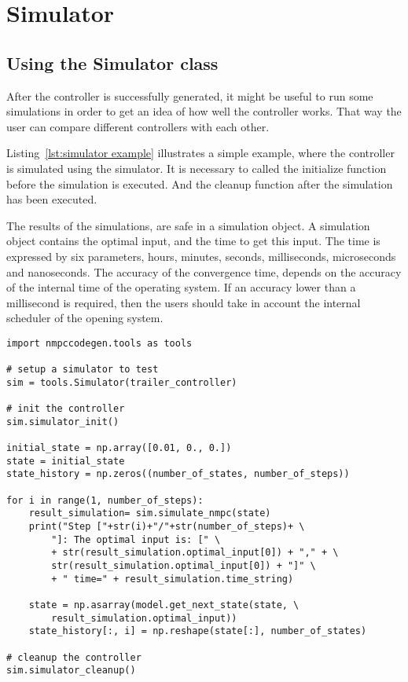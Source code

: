 \section{Simulator}
\subsection{Using the Simulator class}
After the controller is successfully generated, it might be useful to run some simulations in order to get an idea of how well the controller works. That way the user can compare  different controllers with each other.

Listing~\ref{lst:simulator example} illustrates a simple example, where the controller is simulated using the simulator. It is necessary to called the initialize function before the simulation is executed. And the cleanup function after the simulation has been executed.

The results of the simulations, are safe in a simulation object. A simulation object contains the optimal input, and the time to get this input. The time is expressed by six parameters, hours, minutes, seconds, milliseconds, microseconds and nanoseconds. The accuracy of the convergence time, depends on the accuracy of the internal time of the operating system. If an accuracy lower than a millisecond is required, then the users should take in account the internal scheduler of the opening system.

\begin{lstlisting}[caption={Simulator example},captionpos=b,label={lst:simulator example}]
import nmpccodegen.tools as tools

# setup a simulator to test
sim = tools.Simulator(trailer_controller)

# init the controller
sim.simulator_init()

initial_state = np.array([0.01, 0., 0.])
state = initial_state
state_history = np.zeros((number_of_states, number_of_steps))

for i in range(1, number_of_steps):
	result_simulation= sim.simulate_nmpc(state)
	print("Step ["+str(i)+"/"+str(number_of_steps)+ \
		"]: The optimal input is: [" \
		+ str(result_simulation.optimal_input[0]) + "," + \
		str(result_simulation.optimal_input[0]) + "]" \
		+ " time=" + result_simulation.time_string)

	state = np.asarray(model.get_next_state(state, \
		result_simulation.optimal_input))
	state_history[:, i] = np.reshape(state[:], number_of_states)

# cleanup the controller
sim.simulator_cleanup()
\end{lstlisting}

